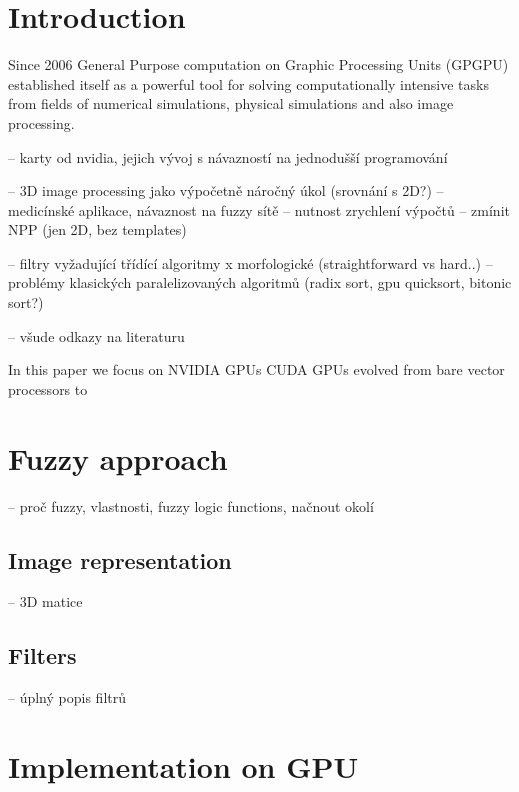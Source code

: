 \documentclass[oneside]{article}
\begin{document}

\section{Introduction}
Since 2006 General Purpose computation on Graphic Processing Units (GPGPU) established itself as a powerful tool for solving computationally intensive tasks from fields of numerical simulations, physical simulations and also image processing. 
 
 -- karty od nvidia, jejich vývoj s návazností na jednodušší programování
 
 -- 3D image processing jako výpočetně náročný úkol (srovnání s 2D?)
 -- medicínské aplikace, návaznost na fuzzy sítě -- nutnost zrychlení výpočtů
 -- zmínit NPP (jen 2D, bez templates)
 
 -- filtry vyžadující třídící algoritmy x morfologické (straightforward vs hard..)
 -- problémy klasických paralelizovaných algoritmů (radix sort, gpu quicksort, bitonic sort?)
 
 -- všude odkazy na literaturu

In this paper we focus on NVIDIA GPUs  CUDA GPUs evolved from bare vector processors to

\section{Fuzzy approach}
 -- proč fuzzy, vlastnosti, fuzzy logic functions, načnout okolí
 
 \subsection{Image representation}
  -- 3D matice
  
 \subsection{Filters}
 -- úplný popis filtrů
 
\section{Implementation on GPU}
\end{document}

